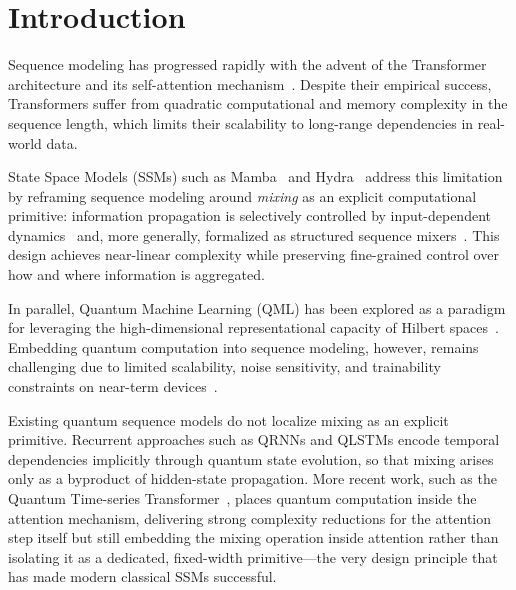 \documentclass[conference]{IEEEtran}
\begin{document}





%



\IEEEpeerreviewmaketitle

\section{Introduction}

Sequence modeling has progressed rapidly with the advent of the Transformer architecture and its self-attention mechanism~\cite{Vaswani}. Despite their empirical success, Transformers suffer from quadratic computational and memory complexity in the sequence length, which limits their scalability to long-range dependencies in real-world data.

State Space Models (SSMs) such as Mamba~\cite{Gu2024} and Hydra~\cite{Hwang} address this limitation by reframing sequence modeling around \emph{mixing} as an explicit computational primitive: information propagation is selectively controlled by input-dependent dynamics~\cite{Gu2024} and, more generally, formalized as structured sequence mixers~\cite{Hwang}. This design achieves near-linear complexity while preserving fine-grained control over how and where information is aggregated.

In parallel, Quantum Machine Learning (QML) has been explored as a paradigm for leveraging the high-dimensional representational capacity of Hilbert spaces~\cite{Mishra2021QML, Tychola2023QMLoverview}. Embedding quantum computation into sequence modeling, however, remains challenging due to limited scalability, noise sensitivity, and trainability constraints on near-term devices~\cite{Lamichhane2025QML}.

Existing quantum sequence models do not localize mixing as an explicit primitive. Recurrent approaches such as QRNNs and QLSTMs encode temporal dependencies implicitly through quantum state evolution, so that mixing arises only as a byproduct of hidden-state propagation. More recent work, such as the Quantum Time-series Transformer~\cite{Park2025QTSTransformer}, places quantum computation inside the attention mechanism, delivering strong complexity reductions for the attention step itself but still embedding the mixing operation inside attention rather than isolating it as a dedicated, fixed-width primitive—the very design principle that has made modern classical SSMs successful.
\end{document}

